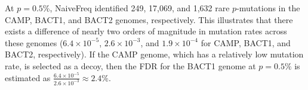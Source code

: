 At $p=0.5$\%, NaiveFreq identified 249, 17,069, and 1,632 rare $p$-mutations in the CAMP, BACT1, and BACT2 genomes, respectively. This illustrates that there exists a difference of nearly two orders of magnitude in mutation rates across these genomes ($6.4 \times 10^{-5}$, $2.6 \times 10^{-3}$, and $1.9 \times 10^{-4}$ for CAMP, BACT1, and BACT2, respectively). If the CAMP genome, which has a relatively low mutation rate, is selected as a decoy, then the FDR for the BACT1 genome at $p=0.5\%$ is estimated as $\frac{6.4 \times 10^{-5}}{2.6 \times 10^{-3}} \approx 2.4\%$.\endinput